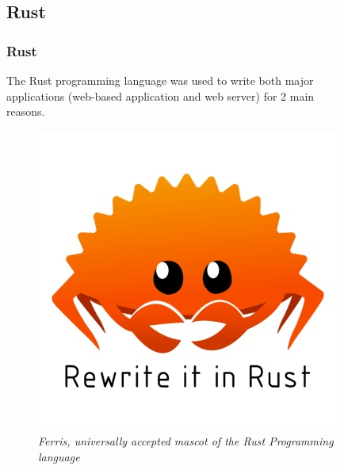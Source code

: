 \documentclass[8pt,compress]{beamer}
\begin{document}
\subsection{Rust}
\begin{frame}
  \frametitle{Rust}
  \begin{minipage}{0.75\textwidth}
    The Rust programming language was used to write both major \\ 
    applications (web-based application and web server) for 2 main \\ reasons.
  \end{minipage}
  \hfill
  \begin{minipage}{0.20\textwidth}
    \begin{figure}
      \includegraphics[width=\textwidth]{assets/misc/rewrite-it-in-rust.jpg}
      \caption{\it Ferris, universally accepted mascot of the Rust Programming language}
    \end{figure}


\end{minipage}
\end{frame}
\end{document}
